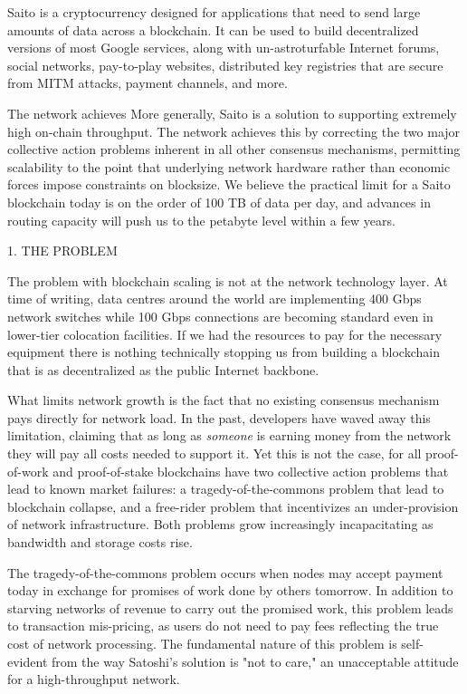 \documentclass[11.5pt, oneside]{article}   	%
\begin{document}
\begin{multicols}{2}
Saito is a cryptocurrency designed for applications that need to send large amounts of data across a blockchain. It can be used to build decentralized versions of most Google services, along with un-astroturfable Internet forums, social networks, pay-to-play websites, distributed key registries that are secure from MITM attacks, payment channels, and more.

The network achieves More generally, Saito is a solution to supporting extremely high on-chain throughput. The network achieves this by correcting the two major collective action problems inherent in all other consensus mechanisms, permitting scalability to the point that underlying network hardware rather than economic forces impose constraints on blocksize. We believe the practical limit for a Saito blockchain today is on the order of 100 TB of data per day, and advances in routing capacity will push us to the petabyte level within a few years.

1. THE PROBLEM

The problem with blockchain scaling is not at the network technology layer. At time of writing, data centres around the world are implementing 400 Gbps network switches while 100 Gbps connections are becoming standard even in lower-tier colocation facilities. If we had the resources to pay for the necessary equipment there is nothing technically stopping us from building a blockchain that is as decentralized as the public Internet backbone.

What limits network growth is the fact that no existing consensus mechanism pays directly for network load. In the past, developers have waved away this limitation, claiming that as long as {\textit{someone}} is earning money from the network they will pay all costs needed to support it. Yet this is not the case, for all proof-of-work and proof-of-stake blockchains have two collective action problems that lead to known market failures: a tragedy-of-the-commons problem that lead to blockchain collapse, and a free-rider problem that incentivizes an under-provision of network infrastructure. Both problems grow increasingly incapacitating as bandwidth and storage costs rise.

The tragedy-of-the-commons problem occurs when nodes may accept payment today in exchange for promises of work done by others tomorrow. In addition to starving networks of revenue to carry out the promised work, this problem leads to transaction mis-pricing, as users do not need to pay fees reflecting the true cost of network processing. The fundamental nature of this problem is self-evident from the way Satoshi's solution is "not to care," an unacceptable attitude for a high-throughput network.


\end{multicols}
\end{document}

